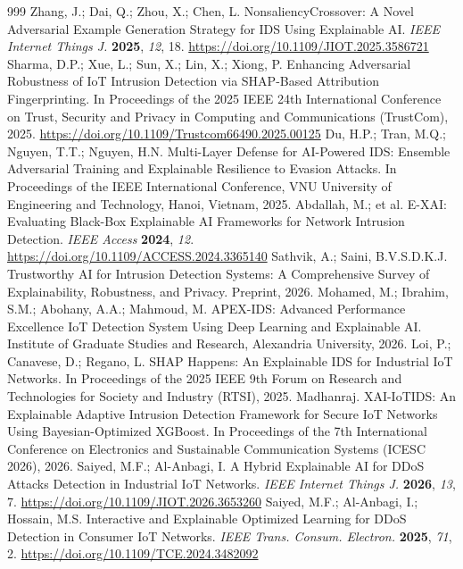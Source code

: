 \begin{thebibliography}{999}
Zhang, J.; Dai, Q.; Zhou, X.; Chen, L. NonsaliencyCrossover: A Novel Adversarial Example Generation Strategy for IDS Using Explainable AI. \textit{IEEE Internet Things J.} \textbf{2025}, \textit{12}, 18. \url{https://doi.org/10.1109/JIOT.2025.3586721}
Sharma, D.P.; Xue, L.; Sun, X.; Lin, X.; Xiong, P. Enhancing Adversarial Robustness of IoT Intrusion Detection via SHAP-Based Attribution Fingerprinting. In Proceedings of the 2025 IEEE 24th International Conference on Trust, Security and Privacy in Computing and Communications (TrustCom), 2025. \url{https://doi.org/10.1109/Trustcom66490.2025.00125}
Du, H.P.; Tran, M.Q.; Nguyen, T.T.; Nguyen, H.N. Multi-Layer Defense for AI-Powered IDS: Ensemble Adversarial Training and Explainable Resilience to Evasion Attacks. In Proceedings of the IEEE International Conference, VNU University of Engineering and Technology, Hanoi, Vietnam, 2025.
Abdallah, M.; et al. E-XAI: Evaluating Black-Box Explainable AI Frameworks for Network Intrusion Detection. \textit{IEEE Access} \textbf{2024}, \textit{12}. \url{https://doi.org/10.1109/ACCESS.2024.3365140}
Sathvik, A.; Saini, B.V.S.D.K.J. Trustworthy AI for Intrusion Detection Systems: A Comprehensive Survey of Explainability, Robustness, and Privacy. Preprint, 2026.
Mohamed, M.; Ibrahim, S.M.; Abohany, A.A.; Mahmoud, M. APEX-IDS: Advanced Performance Excellence IoT Detection System Using Deep Learning and Explainable AI. Institute of Graduate Studies and Research, Alexandria University, 2026.
Loi, P.; Canavese, D.; Regano, L. SHAP Happens: An Explainable IDS for Industrial IoT Networks. In Proceedings of the 2025 IEEE 9th Forum on Research and Technologies for Society and Industry (RTSI), 2025.
Madhanraj. XAI-IoTIDS: An Explainable Adaptive Intrusion Detection Framework for Secure IoT Networks Using Bayesian-Optimized XGBoost. In Proceedings of the 7th International Conference on Electronics and Sustainable Communication Systems (ICESC 2026), 2026.
Saiyed, M.F.; Al-Anbagi, I. A Hybrid Explainable AI for DDoS Attacks Detection in Industrial IoT Networks. \textit{IEEE Internet Things J.} \textbf{2026}, \textit{13}, 7. \url{https://doi.org/10.1109/JIOT.2026.3653260}
Saiyed, M.F.; Al-Anbagi, I.; Hossain, M.S. Interactive and Explainable Optimized Learning for DDoS Detection in Consumer IoT Networks. \textit{IEEE Trans. Consum. Electron.} \textbf{2025}, \textit{71}, 2. \url{https://doi.org/10.1109/TCE.2024.3482092}

\end{thebibliography}
